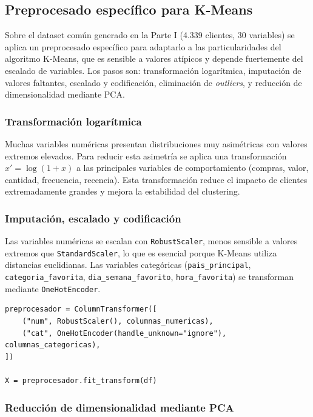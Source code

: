 \documentclass[11pt,a4paper]{article}
\begin{document}
\subsection{Preprocesado específico para K-Means}

Sobre el dataset común generado en la Parte I (4.339 clientes, 30 variables) se aplica un preprocesado específico para adaptarlo a las particularidades del algoritmo K-Means, que es sensible a valores atípicos y depende fuertemente del escalado de variables. Los pasos son: transformación logarítmica, imputación de valores faltantes, escalado y codificación, eliminación de \textit{outliers}, y reducción de dimensionalidad mediante PCA.

\subsubsection{Transformación logarítmica}

Muchas variables numéricas presentan distribuciones muy asimétricas con valores extremos elevados. Para reducir esta asimetría se aplica una transformación $x' = \log(1+x)$ a las principales variables de comportamiento (compras, valor, cantidad, frecuencia, recencia). Esta transformación reduce el impacto de clientes extremadamente grandes y mejora la estabilidad del clustering.

\subsubsection{Imputación, escalado y codificación}

Las variables numéricas se escalan con \texttt{RobustScaler}, menos sensible a valores extremos que \texttt{StandardScaler}, lo que es esencial porque K-Means utiliza distancias euclidianas. Las variables categóricas (\texttt{pais\_principal}, \texttt{categoria\_favorita}, \texttt{dia\_semana\_favorito}, \texttt{hora\_favorita}) se transforman mediante \texttt{OneHotEncoder}.

\begin{lstlisting}
preprocesador = ColumnTransformer([
    ("num", RobustScaler(), columnas_numericas),
    ("cat", OneHotEncoder(handle_unknown="ignore"), columnas_categoricas),
])

X = preprocesador.fit_transform(df)
\end{lstlisting}

\subsubsection{Reducción de dimensionalidad mediante PCA}
\end{document}
